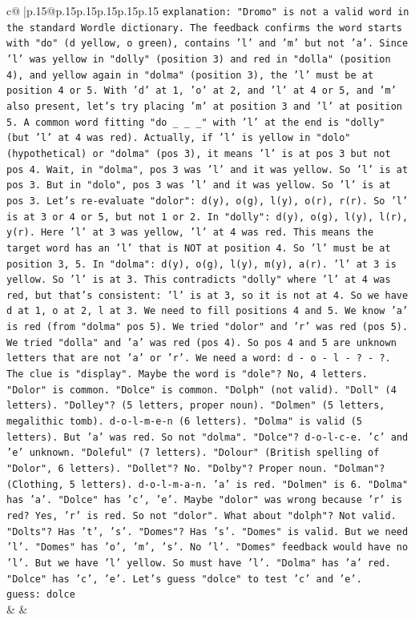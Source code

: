 \documentclass{article}
\begin{document}
{\begin{supertabular}{c@{$\;$}|p{.15\linewidth}@{}p{.15\linewidth}p{.15\linewidth}p{.15\linewidth}p{.15\linewidth}p{.15\linewidth}}
{{{                \texttt{explanation: "Dromo" is not a valid word in the standard Wordle dictionary. The feedback confirms the word starts with "do" (d yellow, o green), contains 'l' and 'm' but not 'a'. Since 'l' was yellow in "dolly" (position 3) and red in "dolla" (position 4), and yellow again in "dolma" (position 3), the 'l' must be at position 4 or 5. With 'd' at 1, 'o' at 2, and 'l' at 4 or 5, and 'm' also present, let's try placing 'm' at position 3 and 'l' at position 5. A common word fitting "do \_ \_ \_" with 'l' at the end is "dolly" (but 'l' at 4 was red). Actually, if 'l' is yellow in "dolo" (hypothetical) or "dolma" (pos 3), it means 'l' is at pos 3 but not pos 4. Wait, in "dolma", pos 3 was 'l' and it was yellow. So 'l' is at pos 3. But in "dolo", pos 3 was 'l' and it was yellow. So 'l' is at pos 3. Let's re{-}evaluate "dolor": d(y), o(g), l(y), o(r), r(r). So 'l' is at 3 or 4 or 5, but not 1 or 2. In "dolly": d(y), o(g), l(y), l(r), y(r). Here 'l' at 3 was yellow, 'l' at 4 was red. This means the target word has an 'l' that is NOT at position 4. So 'l' must be at position 3, 5. In "dolma": d(y), o(g), l(y), m(y), a(r). 'l' at 3 is yellow. So 'l' is at 3. This contradicts "dolly" where 'l' at 4 was red, but that's consistent: 'l' is at 3, so it is not at 4. So we have d at 1, o at 2, l at 3. We need to fill positions 4 and 5. We know 'a' is red (from "dolma" pos 5). We tried "dolor" and 'r' was red (pos 5). We tried "dolla" and 'a' was red (pos 4). So pos 4 and 5 are unknown letters that are not 'a' or 'r'. We need a word: d {-} o {-} l {-} ? {-} ?. The clue is "display". Maybe the word is "dole"? No, 4 letters. "Dolor" is common. "Dolce" is common. "Dolph" (not valid). "Doll" (4 letters). "Dolley"? (5 letters, proper noun). "Dolmen" (5 letters, megalithic tomb). d{-}o{-}l{-}m{-}e{-}n (6 letters). "Dolma" is valid (5 letters). But 'a' was red. So not "dolma". "Dolce"? d{-}o{-}l{-}c{-}e. 'c' and 'e' unknown. "Doleful" (7 letters). "Dolour" (British spelling of "Dolor", 6 letters). "Dollet"? No. "Dolby"? Proper noun. "Dolman"? (Clothing, 5 letters). d{-}o{-}l{-}m{-}a{-}n. 'a' is red. "Dolmen" is 6. "Dolma" has 'a'. "Dolce" has 'c', 'e'. Maybe "dolor" was wrong because 'r' is red? Yes, 'r' is red. So not "dolor". What about "dolph"? Not valid. "Dolts"? Has 't', 's'. "Domes"? Has 's'. "Domes" is valid. But we need 'l'. "Domes" has 'o', 'm', 's'. No 'l'. "Domes" feedback would have no 'l'. But we have 'l' yellow. So must have 'l'. "Dolma" has 'a' red. "Dolce" has 'c', 'e'. Let's guess "dolce" to test 'c' and 'e'.} \\
\texttt{guess: dolce} \\
            }
        }
    }
    & & \\ \\


\end{supertabular}}
\end{document}
